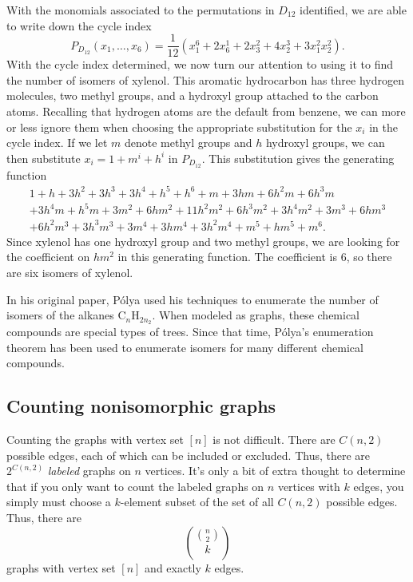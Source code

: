 With the monomials associated to the permutations in $D_{12}$ identified,
we are able to write down the cycle index
\[P_{D_{12}}(x_1,\dots,x_6) = \frac{1}{12}(x_1^6 + 2x_6^1 + 2x_3^2+4x_2^3 + 3x_1^2x_2^2).\]
With the cycle index determined, we now turn our attention to using it
to find the number of isomers of xylenol. This aromatic hydrocarbon
has three hydrogen molecules, two methyl groups, and a hydroxyl group
attached to the carbon atoms. Recalling that hydrogen atoms are the
default from benzene, we can more or less ignore them when choosing
the appropriate substitution for the $x_i$ in the cycle index. If we
let $m$ denote methyl groups and $h$ hydroxyl groups, we can then
substitute $x_i = 1+m^i+h^i$ in $P_{D_{12}}$. This substitution gives the
generating function
\begin{multline*}1+h+3 h^2+3 h^3+3 h^4+h^5+h^6+m+3 h m+6 h^2 m+6 h^3
  m\\+3 h^4 m+h^5 m+3 m^2+6 h m^2+11 h^2 m^2+6 h^3 m^2+3 h^4 m^2+3
  m^3+6 h m^3\\+6 h^2 m^3+3 h^3 m^3+3 m^4+3 h m^4+3 h^2 m^4+m^5+h
  m^5+m^6.\end{multline*}
Since xylenol has one hydroxyl group and two methyl groups, we are
looking for the coefficient on $hm^2$ in this generating function. The
coefficient is $6$, so there are six isomers of xylenol.

In his original paper, P\'olya used his techniques to enumerate the
number of isomers of the alkanes $\text{C}_n\text{H}_{2n_2}$. When
modeled as graphs, these chemical compounds are special types of
trees. Since that time, P\'olya's enumeration theorem has been used to
enumerate isomers for many different chemical compounds.

\subsection{Counting nonisomorphic graphs}\label{ss:polya:graphs}

Counting the graphs with vertex set $[n]$ is not difficult. There are
$C(n,2)$ possible edges, each of which can be included or
excluded. Thus, there are $2^{C(n,2)}$ \emph{labeled} graphs on $n$
vertices. It's only a bit of extra thought to determine that if you
only want to count the labeled graphs on $n$ vertices with $k$ edges,
you simply must choose a $k$-element subset of the set of all $C(n,2)$
possible edges. Thus, there are
\[\binom{\binom{n}{2}}{k}\]
graphs with vertex set $[n]$ and exactly $k$ edges.

